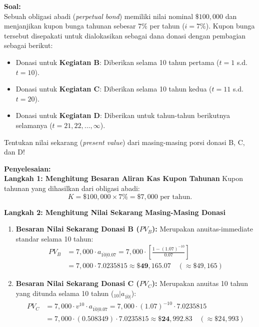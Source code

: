 \documentclass[11pt,a4paper]{article}
\begin{document}
\begin{examplebox}
\textbf{Soal:}\\
Sebuah obligasi abadi (\textit{perpetual bond}) memiliki nilai nominal $\$100{,}000$ dan menjanjikan kupon bunga tahunan sebesar $7\%$ per tahun ($i = 7\%$). Kupon bunga tersebut disepakati untuk dialokasikan sebagai dana donasi dengan pembagian sebagai berikut:
\begin{itemize}
    \item Donasi untuk \textbf{Kegiatan B}: Diberikan selama 10 tahun pertama ($t = 1$ s.d. $t = 10$).
    \item Donasi untuk \textbf{Kegiatan C}: Diberikan selama 10 tahun kedua ($t = 11$ s.d. $t = 20$).
    \item Donasi untuk \textbf{Kegiatan D}: Diberikan untuk tahun-tahun berikutnya selamanya ($t = 21, 22, \dots, \infty$).
\end{itemize}
Tentukan nilai sekarang (\textit{present value}) dari masing-masing porsi donasi B, C, dan D!

\vspace{0.5em}
\textbf{Penyelesaian:}\\
\textbf{Langkah 1: Menghitung Besaran Aliran Kas Kupon Tahunan}
Kupon tahunan yang dihasilkan dari obligasi abadi:
\begin{equation*}
    K = \$100{,}000 \times 7\% = \$7{,}000 \text{ per tahun}.
\end{equation*}

\textbf{Langkah 2: Menghitung Nilai Sekarang Masing-Masing Donasi}
\begin{enumerate}[label=\textbf{\arabic*.}]
    \item \textbf{Besaran Nilai Sekarang Donasi B ($PV_B$):}
    Merupakan anuitas-immediate standar selama 10 tahun:
    \begin{align*}
        PV_B &= 7{,}000 \cdot a_{\overline{10}|0.07} = 7{,}000 \cdot \left[ \frac{1 - (1.07)^{-10}}{0.07} \right] \\
             &= 7{,}000 \cdot 7.0235815 \approx \mathbf{\$49{,}165.07} \quad (\approx \$49{,}165)
    \end{align*}

    \item \textbf{Besaran Nilai Sekarang Donasi C ($PV_C$):}
    Merupakan anuitas 10 tahun yang ditunda selama 10 tahun (${}_{10}| a_{\overline{10}|}$):
    \begin{align*}
        PV_C &= 7{,}000 \cdot v^{10} \cdot a_{\overline{10}|0.07} = 7{,}000 \cdot (1.07)^{-10} \cdot 7.0235815 \\
             &= 7{,}000 \cdot (0.508349) \cdot 7.0235815 \approx \mathbf{\$24{,}992.83} \quad (\approx \$24{,}993)
    \end{align*}


\end{enumerate}
\end{examplebox}
\end{document}
